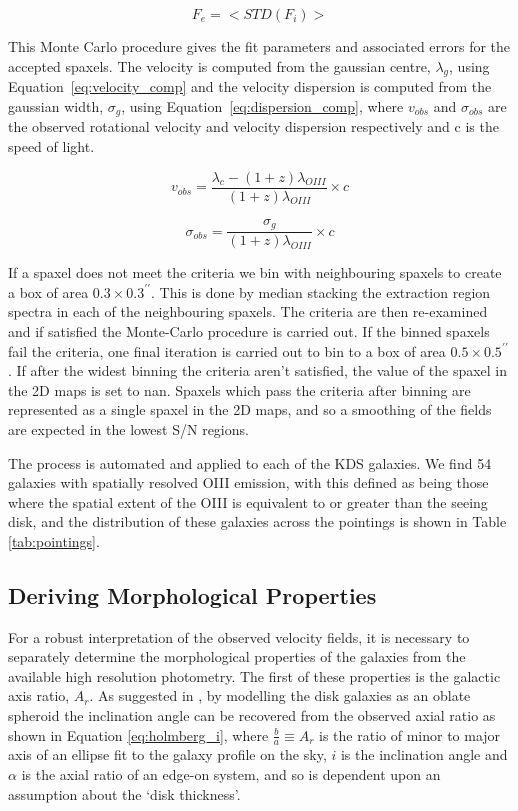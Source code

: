 \documentclass[a4paper,fleqn,usenatbib]{mn2e}
\begin{document}
\begin{equation}\label{eq:cube_error}
   F_{e} = \big<STD(F _{i})\big>
\end{equation}

This Monte Carlo procedure gives the fit parameters and associated errors for the accepted spaxels.
The velocity is computed from the gaussian centre, $\lambda_{g}$, using Equation~\ref{eq:velocity_comp} and the velocity dispersion is computed from the gaussian width, $\sigma_{g}$, using Equation~\ref{eq:dispersion_comp}, where $v_{obs}$ and $\sigma_{obs}$ are the observed rotational velocity and velocity dispersion respectively and c is the speed of light.

\begin{equation}\label{eq:velocity_comp}
   v_{obs} = \frac{\lambda_{c} - (1 + z)\lambda_{OIII}}{(1 + z)\lambda_{OIII}} \times c
\end{equation}

\begin{equation}\label{eq:dispersion_comp}
   \sigma_{obs} = \frac{\sigma_{g}}{(1 + z)\lambda_{OIII}} \times c
\end{equation}

If a spaxel does not meet the criteria we bin with neighbouring spaxels to create a box of area $0.3\times0.3^{\prime\prime}$.
This is done by median stacking the extraction region spectra in each of the neighbouring spaxels.
The criteria are then re-examined and if satisfied the Monte-Carlo procedure is carried out. 
If the binned spaxels fail the criteria, one final iteration is carried out to bin to a box of area $0.5\times0.5^{\prime\prime}$.
If after the widest binning the criteria aren't satisfied, the value of the spaxel in the 2D maps is set to nan.
Spaxels which pass the criteria after binning are represented as a single spaxel in the 2D maps, and so a smoothing of the fields are expected in the lowest S/N regions.

The process is automated and applied to each of the KDS galaxies.
We find 54 galaxies with spatially resolved OIII emission, with this defined as being those where the spatial extent of the OIII is equivalent to or greater than the seeing disk, and the distribution of these galaxies across the pointings is shown in Table \ref{tab:pointings}.

\subsection{Deriving Morphological Properties}
For a robust interpretation of the observed velocity fields, it is necessary to separately determine the morphological properties of the galaxies from the available high resolution photometry.
The first of these properties is the galactic axis ratio, $A_{r}$.
As suggested in \cite{Holmberg1958}, by modelling the disk galaxies as an oblate spheroid the inclination angle can be recovered from the observed axial ratio as shown in Equation \ref{eq:holmberg_i}, where $\frac{b}{a} \equiv A_{r}$ is the ratio of minor to major axis of an ellipse fit to the galaxy profile on the sky, $i$ is the inclination angle and $\alpha$ is the axial ratio of an edge-on system, and so is dependent upon an assumption about the `disk thickness'.
\end{document}
